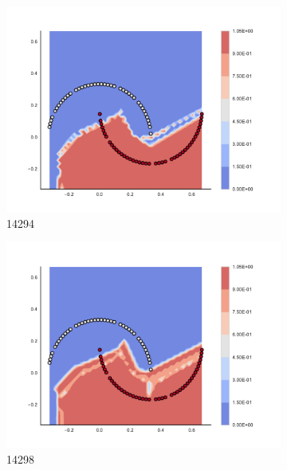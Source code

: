 \begin{figure}[h]
\begin{subfigure}[b]{0.09\textwidth}
    \includegraphics[clip, trim=2.35cm 1.75cm 4.5cm 0cm,width=\textwidth]{img/convergence/14294.pdf}
    \caption{14294}
    \label{fig:convergence_14294}
\end{subfigure}
%
\begin{subfigure}[b]{0.09\textwidth}
    \includegraphics[clip, trim=2.35cm 1.75cm 4.5cm 0cm,width=\textwidth]{img/convergence/14298.pdf}
    \caption{14298}
    \label{fig:convergence_14298}
\end{subfigure}
%
\begin{subfigure}[b]{0.09\textwidth}

\end{subfigure}
\end{figure}
